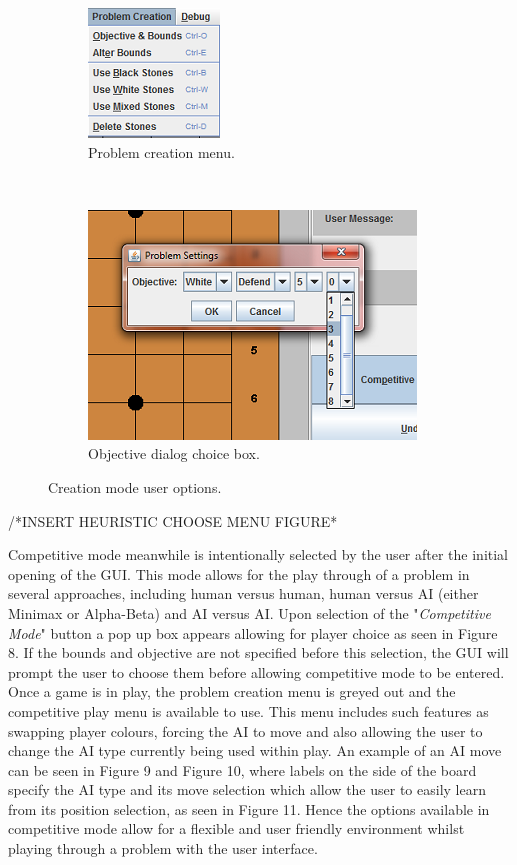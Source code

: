 \documentclass{l3proj}
\begin{document}
\begin{figure}[H]
\begin{subfigure}[H]{0.2\textwidth}
\includegraphics[scale=1]{Images/GUI-6-PCMenu.png}
\caption{Problem creation menu.}
\end{subfigure}
~~~~~~~~~~~~~~~~~~~~~~~~~~~
\begin{subfigure}[H]{0.3\textwidth}
\includegraphics[scale=1]{Images/GUI-7-Objective.png}
\caption{Objective dialog choice box.}
\end{subfigure}
\caption{Creation mode user options.}
\end{figure}

/*INSERT HEURISTIC CHOOSE MENU FIGURE*

Competitive mode meanwhile is intentionally selected by the user after the initial opening of the GUI. This mode allows for the play through of a problem in several approaches, including human versus human, human versus AI (either Minimax or Alpha-Beta) and AI versus AI. Upon selection of the "\textit{Competitive Mode}" button a pop up box appears allowing for player choice as seen in Figure 8. If the bounds and objective are not specified before this selection, the GUI will prompt the user to choose them before allowing competitive mode to be entered. Once a game is in play, the problem creation menu is greyed out and the competitive play menu is available to use. This menu includes such features as swapping player colours, forcing the AI to move and also allowing the user to change the AI type currently being used within play. An example of an AI move can be seen in Figure 9 and Figure 10, where labels on the side of the board specify the AI type and its move selection which allow the user to easily learn from its position selection, as seen in Figure 11. Hence the options available in competitive mode allow for a flexible and user friendly environment whilst playing through a problem with the user interface.
\end{document}
